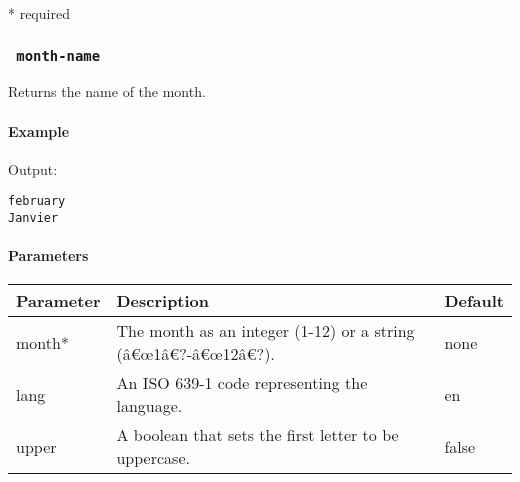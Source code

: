 * required

\subsubsection{\texorpdfstring{\texttt{\ month-name\ }}{ month-name }}\label{month-name}

Returns the name of the month.

\paragraph{Example}\label{example-1}

\begin{Shaded}
\begin{Highlighting}[]

\end{Highlighting}
\end{Shaded}

Output:

\begin{verbatim}
february
Janvier
\end{verbatim}

\paragraph{Parameters}\label{parameters-1}

\begin{Shaded}
\begin{Highlighting}[]
\end{Highlighting}
\end{Shaded}

\begin{longtable}[]{@{}lll@{}}
\toprule\noalign{}
Parameter & Description & Default \\
\midrule\noalign{}
\endhead
\bottomrule\noalign{}
\endlastfoot
month* & The month as an integer (1-12) or a string (â€œ1â€?-â€œ12â€?).
& none \\
lang & An ISO 639-1 code representing the language. & en \\
upper & A boolean that sets the first letter to be uppercase. & false \\
\end{longtable}

